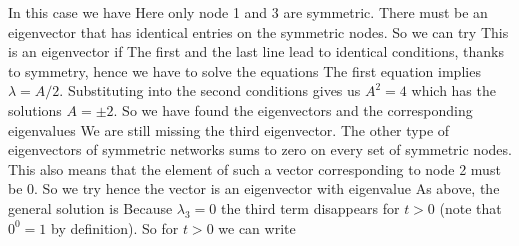 \solution
In this case we have
Here only node 1 and 3 are symmetric. There must be an eigenvector that has identical entries on the symmetric nodes. So we can try 
This is an eigenvector if 
The first and the last line lead to identical conditions, thanks to symmetry, hence we have to solve the equations
The first equation implies $\lambda=A/2$. Substituting into the second conditions gives us $A^2=4$ which has the solutions $A=\pm 2$. So we have found the eigenvectors 
and the corresponding eigenvalues 
We are still missing the third eigenvector. The other type of eigenvectors of symmetric networks sums to zero on every set of symmetric nodes. This also means that the element of such a vector corresponding to node 2 must be 0. So we try 
hence the vector 
is an eigenvector with eigenvalue 
As above, the general solution is 
Because $\lambda_3=0$ the third term disappears for $t>0$ (note that $0^0=1$ by definition). So for $t>0$ we can write

